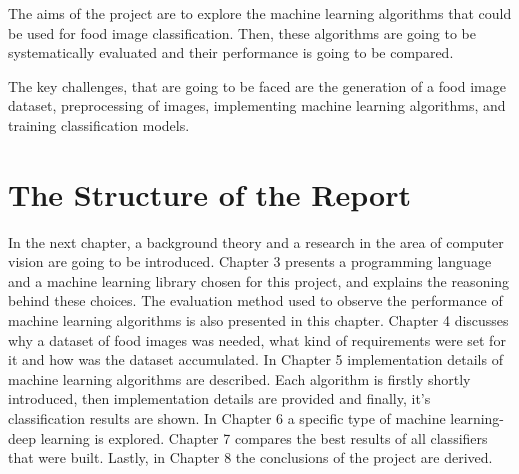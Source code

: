The aims of the project are to explore the machine learning algorithms that could be used for food image classification.
Then, these algorithms are going to be systematically evaluated and their performance is going to be compared.

The key challenges, that are going to be faced are the generation of a food image dataset, preprocessing of images, implementing machine learning algorithms, and training classification models.

\section{The Structure of the Report}
In the next chapter, a background theory and a research in the area of computer vision are going to be introduced. Chapter 3 presents a programming language and a  machine learning library chosen for this project, and explains the reasoning behind these choices. The evaluation method used to observe the performance of machine learning algorithms  is also presented in this chapter. Chapter 4 discusses why a dataset of food images was needed, what kind of requirements were set for it and how was the dataset accumulated. In Chapter 5 implementation details of machine learning algorithms are described. Each algorithm is firstly shortly introduced, then implementation details are provided and finally, it's classification results are shown.  In Chapter 6 a specific type of machine learning- deep learning is explored. Chapter 7 compares the best results of all classifiers that were built. Lastly, in Chapter 8 the conclusions of the project are derived.